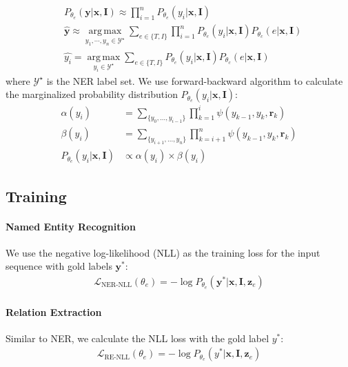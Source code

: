 \documentclass[11pt]{article}
\newcommand{\mcL}{\mathcal{L}}
\def\vr{{\bm{r}}}
\def\vx{{\bm{x}}}
\def\vy{{\bm{y}}}
\def\vz{{\bm{z}}}
\def\mI{{\bm{I}}}
\DeclareMathOperator*{\argmax}{arg\,max}
\begin{document}
\begin{align*}
    &P_{\theta_e}(\vy|\vx,\mI) \approx \prod\limits_{i=1}^n P_{\theta_e}(y_i|\vx,\mI)    \\
    &\hat{\vy} {\approx} \argmax\limits_{y_1,\cdots, y_n \in \mathcal{Y}^{\star}} \sum\limits_{e \in \{T,I\}} \prod\limits_{i=1}^n P_{\theta_e}(y_i|\vx,\mI)P_{\theta_c}(e|\vx,\mI)\\
    &\hat{y_i} = \argmax \limits_{y_i \in \mathcal{Y}^{\star}} \sum\limits_{e \in \{T,I\}} P_{\theta_e}(y_i|\vx,\mI)P_{\theta_c}(e|\vx,\mI)
\end{align*}
where $\mathcal{Y}^{\star}$ is the NER label set. We use forward-backward algorithm to calculate the marginalized probability distribution $P_{\theta_e}(y_i|\vx,\mI)$:
\begin{align}
\alpha(y_i)&=\sum\limits_{\{y_0,\dots,y_{i-1}\}} \prod\limits_{k=1}^{i} \psi(y_{k-1}, y_k, \vr_k)\nonumber\\
\beta(y_i) &= \sum\limits_{\{y_{i+1},\dots,y_n\}} \prod\limits_{k=i+1}^{n} \psi(y_{k-1}, y_k, \vr_k)\nonumber\\
P_{\theta_e}(y_i|\vx,\mI)
&\propto \alpha(y_i) \times \beta(y_i) \nonumber \end{align}






\subsection{Training}
\paragraph{Named Entity Recognition} We use the negative log-likelihood (NLL) as the training loss for the input sequence with gold labels $\vy^*$:
\begin{align}
\mcL_{\text{NER-NLL}}(\theta_e) = - \log P_{\theta_e}(\vy^*|\vx, \mI, \vz_e) \label{eq:nll_loss}
\end{align}

\paragraph{Relation Extraction} Similar to NER, we calculate the NLL loss with the gold label $y^*$:
\begin{align}
\mcL_{\text{RE-NLL}}(\theta_e) = - \log P_{\theta_e}(y^*|\vx, \mI, \vz_e) \label{eq:re_nll_loss}
\end{align}
\end{document}
